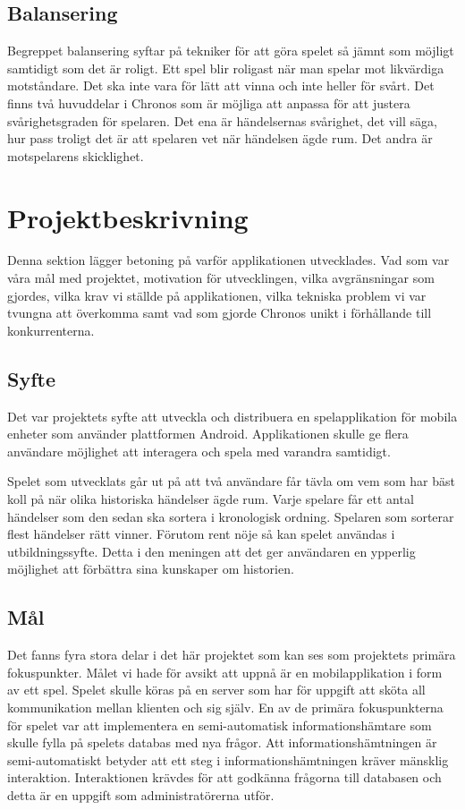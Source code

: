 \documentclass[a4paper, 11pt]{article}
\begin{document}
\subsection{Balansering}
Begreppet balansering syftar på tekniker för att göra spelet så jämnt som möjligt samtidigt som det är roligt. Ett spel blir roligast när man spelar mot likvärdiga motståndare. Det ska inte vara för lätt att vinna och inte heller för svårt. Det finns två huvuddelar i Chronos som är möjliga att anpassa för att justera svårighetsgraden för spelaren. Det ena är händelsernas svårighet, det vill säga, hur pass troligt det är att spelaren vet när händelsen ägde rum. Det andra är motspelarens skicklighet.


\section{Projektbeskrivning}
Denna sektion lägger betoning på varför applikationen utvecklades. Vad som var våra mål med projektet, motivation för utvecklingen, vilka avgränsningar som gjordes, vilka krav vi ställde på applikationen, vilka tekniska problem vi var tvungna att överkomma samt vad som gjorde Chronos unikt i förhållande till konkurrenterna.

\subsection{Syfte}
Det var projektets syfte att utveckla och distribuera en spelapplikation för mobila enheter som använder plattformen Android. Applikationen skulle ge flera användare möjlighet att interagera och spela med varandra samtidigt.

Spelet som utvecklats går ut på att två användare får tävla om vem som har bäst koll på när olika historiska händelser ägde rum. Varje spelare får ett antal händelser som den sedan ska sortera i kronologisk ordning. Spelaren som sorterar flest händelser rätt vinner. Förutom rent nöje så kan spelet användas i utbildningssyfte. Detta i den meningen att det ger användaren en ypperlig möjlighet att förbättra sina kunskaper om historien.

\subsection{Mål}
Det fanns fyra stora delar i det här projektet som kan ses som projektets primära fokuspunkter. Målet vi hade för avsikt att uppnå är en mobilapplikation i form av ett spel. Spelet skulle köras på en server som har för uppgift att sköta all kommunikation mellan klienten och sig själv. En av de primära fokuspunkterna för spelet var att implementera en semi-automatisk informationshämtare som skulle fylla på spelets databas med nya frågor. Att informationshämtningen är semi-automatiskt betyder att ett steg i informationshämtningen kräver mänsklig interaktion. Interaktionen krävdes för att godkänna frågorna till databasen och detta är en uppgift som administratörerna utför. 
\end{document}
